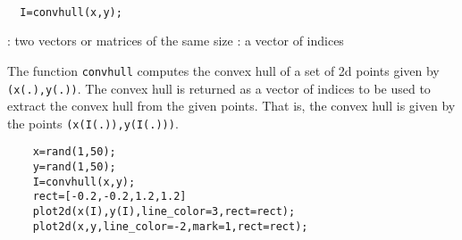 \begin{mandesc}
  \\
\end{mandesc}
\begin{calling_sequence}
\begin{verbatim}
  I=convhull(x,y);
\end{verbatim}
\end{calling_sequence}
\begin{parameters}
  \begin{varlist}
    : two vectors or matrices of the same size
    : a vector of indices 
  \end{varlist}
\end{parameters}

\begin{mandescription}
  The function \verb+convhull+ computes the convex hull of 
  a set of 2d points given by \verb!(x(.),y(.))!. The convex 
  hull is returned as a vector of indices to be used to extract 
  the convex hull from the given points. That is, the convex hull 
  is given by the points \verb!(x(I(.)),y(I(.)))!.
\end{mandescription}
\begin{examples}
  \begin{Verbatim}
    x=rand(1,50);
    y=rand(1,50);
    I=convhull(x,y);
    rect=[-0.2,-0.2,1.2,1.2]
    plot2d(x(I),y(I),line_color=3,rect=rect);
    plot2d(x,y,line_color=-2,mark=1,rect=rect);
  \end{Verbatim}
\end{examples}


